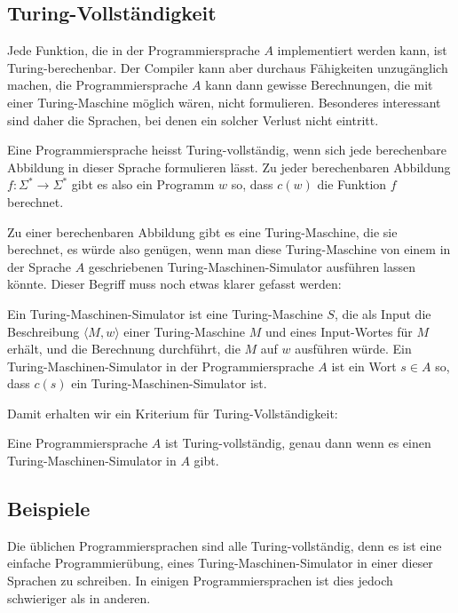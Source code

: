 \subsection{Turing-Vollständigkeit}
Jede Funktion, die in der Programmiersprache $A$ implementiert werden
kann, ist Turing-berechenbar.
Der Compiler kann
aber durchaus Fähigkeiten unzugänglich machen, die Programmiersprache
$A$ kann dann gewisse Berechnungen, die mit einer Turing-Maschine
möglich wären, nicht formulieren. Besonderes interessant sind daher
die Sprachen, bei denen ein solcher Verlust nicht eintritt.

\begin{definition}
Eine Programmiersprache heisst Turing-vollständig, wenn sich jede
berechenbare Abbildung in dieser Sprache formulieren lässt.
Zu jeder berechenbaren Abbildung $f\colon\Sigma^*\to \Sigma^*$ gibt
es also ein Programm $w$ so, dass $c(w)$ die Funktion $f$ berechnet.
\end{definition}

Zu einer berechenbaren Abbildung gibt es eine Turing-Maschine, die
sie berechnet, es würde also genügen, wenn man diese Turing-Maschine
von einem in der Sprache $A$ geschriebenen Turing-Maschinen-Simulator
ausführen lassen könnte. Dieser Begriff muss noch etwas klarer gefasst
werden:

\begin{definition}
Ein Turing-Maschinen-Simulator ist eine Turing-Maschine $S$, die als Input
die Beschreibung $\langle M,w\rangle$ einer Turing-Maschine $M$ und eines
Input-Wortes für $M$ erhält, und die Berechnung durchführt, die $M$ auf $w$
ausführen würde.
Ein Turing-Maschinen-Simulator in der Programmiersprache $A$ ist
ein Wort $s\in A$ so, dass $c(s)$ ein Turing-Maschinen-Simulator ist.
\end{definition}

Damit erhalten wir ein Kriterium für Turing-Vollständigkeit:

\begin{satz}
\label{turingvollstaendigkeitskriterium}
Eine Programmiersprache $A$ ist Turing-vollständig, genau dann
wenn es einen Turing-Maschinen-Simulator in $A$ gibt.
\end{satz}


\subsection{Beispiele}
Die üblichen Programmiersprachen sind alle Turing-vollständig, denn es
ist eine einfache Programmierübung, eines Turing-Maschinen-Simulator
in einer dieser Sprachen zu schreiben. In einigen Programmiersprachen
ist dies jedoch schwieriger als in anderen.

